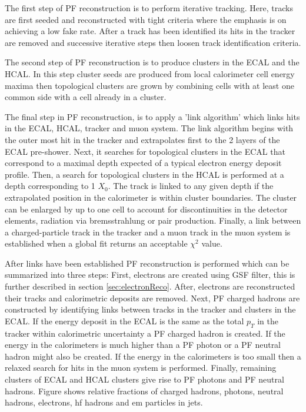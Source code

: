 The first step of PF reconstruction is to perform
iterative tracking. Here, tracks are first seeded and reconstructed with tight criteria
where the emphasis is on achieving a low fake rate. 
After a track has been identified its hits in the tracker are removed and successive iterative steps
then loosen track identification criteria.

The second step of PF reconstruction is to produce clusters in the ECAL and the HCAL. 
In this step cluster seeds are produced from local calorimeter cell energy maxima
then topological clusters are grown by combining cells with at least one common side
with a cell already in a cluster. 

The final step in PF reconstruction, is to apply a 'link algorithm' which links
hits in the ECAL, HCAL, tracker and muon system. The link algorithm
begins with the outer most hit in the tracker and extrapolates
first to the 2 layers of the ECAL pre-shower. Next, it searches for topological clusters
in the ECAL that correspond to a maximal depth expected of a typical
electron energy deposit profile. Then, a search for topological clusters in the
HCAL is performed at a depth corresponding to 1 $X_{0}$.
The track is linked to any given depth if the extrapolated position in 
the calorimeter is within cluster boundaries. The cluster can be enlarged by up 
to one cell to account for discontinuities in the detector elements, radiation via
bremsstrahlung or pair production. Finally, a link between a charged-particle
track in the tracker and a muon track in the muon system is established
when a global fit returns an acceptable $\chi^{2}$ value.

After links have been established PF reconstruction is performed which
can be summarized into three steps: First, electrons are created using GSF filter,
this is further described in section \ref{sec:electronReco}. After, electrons
are reconstructed their tracks and calorimetric deposits are removed. Next, 
PF charged hadrons are constructed by identifying links between tracks in the 
tracker and clusters in the ECAL. If the energy deposit in the ECAL is 
the same as the total $p_{T}$ in the tracker within calorimetric uncertainty a 
PF charged hadron is created. If the energy in the calorimeters is much higher
than a PF photon or a PF neutral hadron might also be created. If the energy in 
the calorimeters is too small then a relaxed search for hits in the muon system
is performed. Finally, remaining clusters of ECAL and HCAL clusters give rise
to PF photons and PF neutral hadrons. Figure %
shows relative fractions of charged hadrons, photons, neutral hadrons, electrons,
hf hadrons and em particles in jets.

